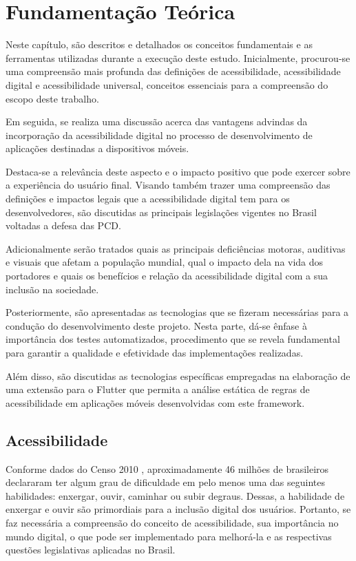 \chapter{Fundamentação Teórica}

Neste capítulo, são descritos e detalhados os conceitos fundamentais e as ferramentas utilizadas durante a execução deste estudo. Inicialmente, procurou-se uma compreensão mais profunda das definições de acessibilidade, acessibilidade digital e acessibilidade universal, conceitos essenciais para a compreensão do escopo deste trabalho.

Em seguida, se realiza uma discussão acerca das vantagens advindas da incorporação da acessibilidade digital no processo de desenvolvimento de aplicações destinadas a dispositivos móveis.

Destaca-se a relevância deste aspecto e o impacto positivo que pode exercer sobre a experiência do usuário final. Visando também trazer uma compreensão das definições e impactos legais que a acessibilidade digital tem para os desenvolvedores, são discutidas as principais legislações vigentes no Brasil voltadas a defesa das PCD. 

Adicionalmente serão tratados quais as principais deficiências motoras, auditivas e visuais que afetam a população mundial, qual o impacto dela na vida dos portadores e quais os benefícios e relação da acessibilidade digital com a sua inclusão na sociedade.

Posteriormente, são apresentadas as tecnologias que se fizeram necessárias para a condução do desenvolvimento deste projeto. Nesta parte, dá-se ênfase à importância dos testes automatizados, procedimento que se revela fundamental para garantir a qualidade e efetividade das implementações realizadas.

Além disso, são discutidas as tecnologias específicas empregadas na elaboração de uma extensão para o Flutter que permita a análise estática de regras de acessibilidade em aplicações móveis desenvolvidas com este framework.

\section{Acessibilidade}

Conforme dados do Censo 2010 \cite{censo2010}, aproximadamente 46 milhões de brasileiros declararam ter algum grau de dificuldade em pelo menos uma das seguintes habilidades: enxergar, ouvir, caminhar ou subir degraus. Dessas, a habilidade de enxergar e ouvir são primordiais para a inclusão digital dos usuários. Portanto, se faz necessária a compreensão do conceito de acessibilidade, sua importância no mundo digital, o que pode ser implementado para melhorá-la e as respectivas questões legislativas aplicadas no Brasil.

